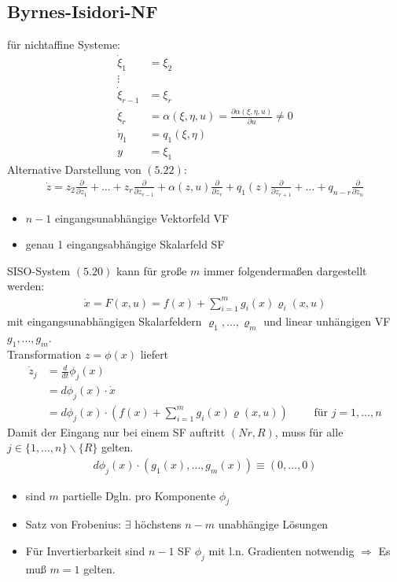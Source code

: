 \documentclass[ngerman]{tudscrreprt}
\begin{document}
\subsection*{Byrnes-Isidori-NF} für nichtaffine Systeme: 
\begin{align*}
\dot \xi_1 &= \xi_2\\ 
\vdots\\ \tag{5.22}
\dot \xi_{r-1}& = \xi_r\\ 
\dot \xi_r &= \alpha(\xi, \eta, u) = \frac{\partial \alpha (\xi, \eta, u)}{\partial u} \ne 0 \\ 
\dot \eta_1 &= q_1(\xi, \eta)\\ 
y &= \xi_1
\end{align*}
Alternative Darstellung von $(5.22):$
\begin{align*}
\dot z = z_2\frac{\partial}{\partial z_1} + \dots + z_r\frac{\partial}{\partial z_{r-1}} + \alpha(z,u)\frac{\partial}{\partial z_r} + q_1(z)\frac{\partial}{\partial z_{r+1}} + \dots + q_{n-r}\frac{\partial}{\partial z_n} \tag{5.23}
\end{align*}
\begin{itemize}
\item $n-1$ eingangsunabhängige Vektorfeld VF
\item genau 1 eingangsabhängige Skalarfeld SF
\end{itemize}
SISO-System $(5.20)$ kann für große $m$ immer folgendermaßen dargestellt werden:
\begin{align*}
\dot x = F(x,u) = f(x) + \sum\limits_{i=1}^{m} g_i(x)\varrho_i(x,u)
\end{align*}
mit eingangsunabhängigen Skalarfeldern $\varrho_1,\dots, \varrho_m$ und linear unhängigen VF $g_1, \dots, g_m.$\\ 
Transformation $z = \phi(x) $ liefert \begin{align*}
\dot z_j &= \frac{d}{dt}\phi_j(x)\\ 
&=d\phi_j(x)\cdot \dot x\\ 
&= d\phi_j(x)\cdot(f(x) + \sum\limits_{i=1}^{m}g_i(x) \varrho(x,u)) \qquad \text{ für  } j= 1,\dots, n\end{align*}
Damit der Eingang nur bei einem SF auftritt  $(Nr, R)$, muss für alle $j \in \{ 1,\dots, n\}\backslash \{R\}$ gelten. 
\begin{align*}
d\phi_j(x) \cdot (g_1(x) ,\dots, g_m(x))\equiv (0,\dots, 0)
\end{align*}
\begin{itemize}
\item sind $m$ partielle Dgln. pro Komponente $\phi_j$ 
\item Satz von Frobenius: $\exists$ höchstens $n-m$ unabhängige Lösungen
\item Für Invertierbarkeit sind $n-1$ SF $\phi_j$ mit l.n. Gradienten notwendig $\Rightarrow$ Es muß $m=1$ gelten.
\end{itemize}
\end{document}
